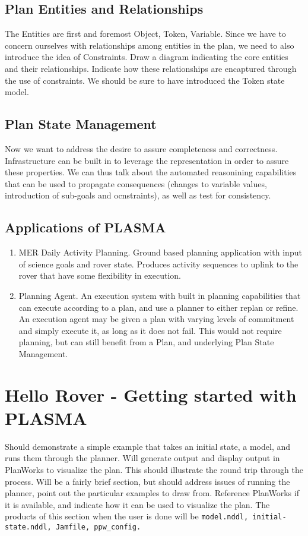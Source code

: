 \documentclass[10pt, letterpaper, twoside]{article}
\begin{document}
\subsection{Plan Entities and Relationships}
The Entities are first and foremost Object, Token, Variable. Since we have to concern ourselves with relationships among entities in the plan, we need to also introduce the idea of Constraints. Draw a diagram indicating the core entities and their relationships. Indicate how these relationships are encaptured through the use of constraints. We should be sure to have introduced the Token state model.
\subsection{Plan State Management}
Now we want to address the desire to assure completeness and correctness. Infrastructure can be built in to leverage the representation in order to assure these properties. We can thus talk about the automated reasonining capabilities that can be used to propagate consequences (changes to variable values, introduction of sub-goals and ocnstraints), as well as test for consistency.

\subsection{Applications of PLASMA}
\begin{enumerate}
\item MER Daily Activity Planning. Ground based planning application with input of science goals and rover state. Produces activity sequences to uplink to the rover that have some flexibility in execution.
\item Planning Agent. An execution system with built in planning capabilities that can execute according to a plan, and use a planner to either replan or refine. An execution agent may be given a plan with varying levels of commitment and simply execute it, as long as it does not fail. This would not require planning, but can still benefit from a Plan, and underlying Plan State Management.
\end{enumerate}


\section{Hello Rover - Getting started with PLASMA}
Should demonstrate a simple example that takes an initial state, a model, and runs them through the planner. Will generate output and display output in PlanWorks to visualize the plan. This should illustrate the round trip through the process. Will be a fairly brief section, but should address issues of running the planner, point out the particular examples to draw from. Reference PlanWorks if it is available, and indicate how it can be used to visualize the plan. The products of this section when the user is done will be \verb!model.nddl, initial-state.nddl, Jamfile, ppw_config.!
\end{document}
